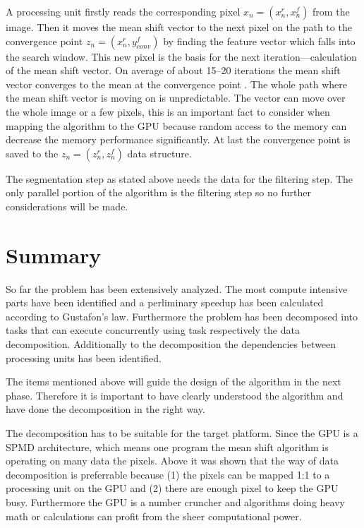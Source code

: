 A processing unit firstly reads the corresponding pixel $x_n = (x_n^r, x_n^f)$
from the image. Then it moves the mean shift vector to the next pixel on the
path to the convergence point $z_n = (x_n^r, y_{conv}^f)$ by finding the feature
vector which falls into the search window. This new pixel is the basis for the
next iteration---calculation of the mean shift vector. On average of about
15--20 iterations the mean shift vector converges to the mean at the convergence
point \citep{DBLP:conf/eccv/ZhangKT06}. The whole path where the mean shift
vector is moving on is unpredictable. The vector can move over the whole image
or a few pixels, this is an important fact to consider when mapping the
algorithm to the \gls{GPU} because random access to the memory can decrease the
memory performance significantly. At last the convergence point is saved to the
$z_n = (z_n^r, z_n^f)$ data structure.

The segmentation step as stated above needs the data for the filtering step. The
only parallel portion of the algorithm is the filtering step so no further 
considerations will be made. 

\section{Summary} %
\label{sec:analysis_summary}
So far the problem has been extensively analyzed. The most compute intensive
parts have been identified and a perliminary speedup has been calculated
according to Gustafon's law. Furthermore the problem has been decomposed into
tasks that can execute concurrently using task respectively the data
decomposition. Additionally to the decomposition the dependencies between
processing units has been identified. 

The items  mentioned above will guide the design of the algorithm in the next
phase. Therefore it is important to have clearly understood the algorithm and
have done the decomposition in the right way. 

The decomposition has to be suitable for the target platform. Since the
\gls{GPU} is a \gls{SPMD} architecture, which means one program the mean shift
algorithm is operating on many data the pixels. Above it was shown that the way
of data decomposition is preferrable because (1) the pixels can be mapped 1:1 to
a processing unit on the \gls{GPU} and (2) there are enough pixel to keep the
\gls{GPU} busy. Furthermore the \gls{GPU} is a number cruncher and algorithms
doing heavy math or calculations can profit from the sheer computational power.

